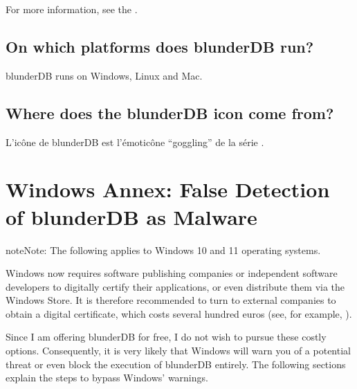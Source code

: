 \documentclass[letterpaper,10pt,english]{sphinxmanual}
\begin{document}
\sphinxAtStartPar
For more information, see the .


\subsection{On which platforms does blunderDB run?}
\label{\detokenize{faq:sur-quelles-plateformes-blunderdb-fonctionne-t-il}}
\sphinxAtStartPar
blunderDB runs on Windows, Linux and Mac.


\subsection{Where does the blunderDB icon come from?}
\label{\detokenize{faq:d-ou-vient-l-icone-de-blunderdb}}
\sphinxAtStartPar
L’icône de blunderDB est l’émoticône “goggling” de la série .

\sphinxstepscope


\section{Windows Annex: False Detection of blunderDB as Malware}
\label{\detokenize{annexe_windows_securite:annexe-windows-detection-abusive-de-blunderdb-comme-logiciel-malveillant}}\label{\detokenize{annexe_windows_securite:annexe-windows-malware}}\label{\detokenize{annexe_windows_securite::doc}}
\begin{sphinxadmonition}{note}{Note:}
\sphinxAtStartPar
The following applies to Windows 10 and 11 operating systems.
\end{sphinxadmonition}

\sphinxAtStartPar
Windows now requires software publishing companies or independent software developers to digitally certify their applications, or even distribute them via the Windows Store. It is therefore recommended to turn to external companies to obtain a digital certificate, which costs several hundred euros (see, for example, ).

\sphinxAtStartPar
Since I am offering blunderDB for free, I do not wish to pursue these costly options. Consequently, it is very likely that Windows will warn you of a potential threat or even block the execution of blunderDB entirely. The following sections explain the steps to bypass Windows’ warnings.
\end{document}
